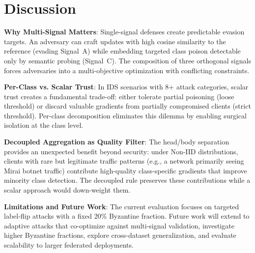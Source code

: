 \documentclass[conference]{IEEEtran}
\begin{document}
\section{Discussion}
\label{sec:discussion}

\textbf{Why Multi-Signal Matters}: Single-signal defenses create predictable evasion targets. An adversary can craft updates with high cosine similarity to the reference (evading Signal~A) while embedding targeted class poison detectable only by semantic probing (Signal~C). The composition of three orthogonal signals forces adversaries into a multi-objective optimization with conflicting constraints.

\textbf{Per-Class vs. Scalar Trust}: In IDS scenarios with 8+ attack categories, scalar trust creates a fundamental trade-off: either tolerate partial poisoning (loose threshold) or discard valuable gradients from partially compromised clients (strict threshold). Per-class decomposition eliminates this dilemma by enabling surgical isolation at the class level.

\textbf{Decoupled Aggregation as Quality Filter}: The head/body separation provides an unexpected benefit beyond security: under Non-IID distributions, clients with rare but legitimate traffic patterns (e.g., a network primarily seeing Mirai botnet traffic) contribute high-quality class-specific gradients that improve minority class detection. The decoupled rule preserves these contributions while a scalar approach would down-weight them.

\textbf{Limitations and Future Work}: The current evaluation focuses on targeted label-flip attacks with a fixed 20\% Byzantine fraction. Future work will extend to adaptive attacks that co-optimize against multi-signal validation, investigate higher Byzantine fractions, explore cross-dataset generalization, and evaluate scalability to larger federated deployments.

\end{document}
